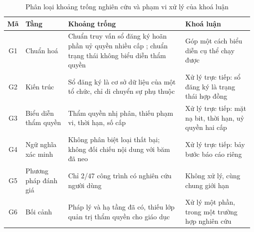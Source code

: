 \begin{table}[H]
\centering
\caption{Phân loại khoảng trống nghiên cứu và phạm vi xử lý của khoá luận}
\label{tab:v2-gap}
\renewcommand{\arraystretch}{1.25}
\small
\begin{tabular}{|c|p{2.2cm}|p{5.6cm}|p{4.6cm}|}
\hline
\textbf{Mã} & \textbf{Tầng} & \textbf{Khoảng trống} & \textbf{Khoá luận} \\ \hline
G1 & Chuẩn hoá & Chuẩn truy vấn sổ đăng ký hoãn phần uỷ quyền nhiều cấp \cite{ToIP_TRQP2026}; chuẩn trạng thái không biểu diễn thẩm quyền & Góp một cách biểu diễn cụ thể chạy được \\ \hline
G2 & Kiến trúc & Sổ đăng ký là cơ sở dữ liệu của một tổ chức, chỉ di chuyển sự phụ thuộc \cite{SSI_Survey2025} & Xử lý trực tiếp: sổ đăng ký là trạng thái hợp đồng \\ \hline
G3 & Biểu diễn thẩm quyền & Thẩm quyền nhị phân, thiếu phạm vi, thời hạn, số cấp & Xử lý trực tiếp: mặt nạ bit, thời hạn, uỷ quyền hai cấp \\ \hline
G4 & Ngữ nghĩa xác minh & Không phân biệt loại thất bại; không đối chiếu nội dung với băm đã neo & Xử lý trực tiếp: bảy bước báo cáo riêng \\ \hline
G5 & Phương pháp đánh giá & Chỉ 2/47 công trình có nghiên cứu người dùng \cite{Ambati2026} & Không xử lý, cùng chung giới hạn \\ \hline
G6 & Bối cảnh & Pháp lý và hạ tầng đã có, thiếu lớp quản trị thẩm quyền cho giáo dục & Xử lý một phần, trong một trường hợp nghiên cứu \\ \hline
\end{tabular}
\end{table}
